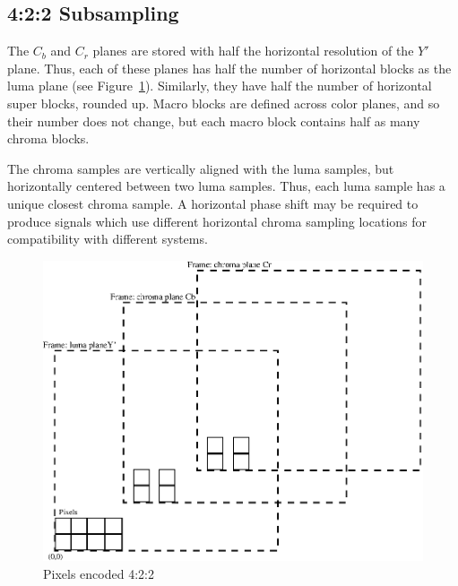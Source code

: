 \documentclass[9pt,letterpaper]{book}
\numberwithin{equation}{chapter}
\numberwithin{figure}{chapter}
\numberwithin{table}{chapter}
\begin{document}
%
%
%
%
%
%


\subsection{4:2:2 Subsampling}
\label{sec:422}

The $C_b$ and $C_r$ planes are stored with half the horizontal resolution of
 the $Y'$ plane.
Thus, each of these planes has half the number of horizontal blocks as the luma
 plane (see Figure~\ref{fig:pixel422}).
Similarly, they have half the number of horizontal super blocks, rounded up.
Macro blocks are defined across color planes, and so their number does not
 change, but each macro block contains half as many chroma blocks.

The chroma samples are vertically aligned with the luma samples, but
 horizontally centered between two luma samples.
Thus, each luma sample has a unique closest chroma sample.
A horizontal phase shift may be required to produce signals which use different
 horizontal chroma sampling locations for compatibility with different systems.

\begin{figure}[htbp]
\begin{center}
\includegraphics{pixel422}
\end{center}
\caption{Pixels encoded 4:2:2}
\label{fig:pixel422}
\end{figure}

%
%
%
%
%
%
\end{document}
